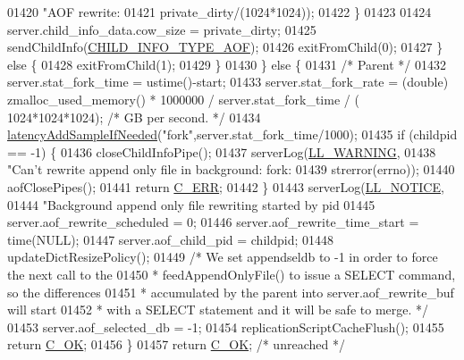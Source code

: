 \begin{DoxyCode}
{{{{{{{{{{{{{{{{{{{{{{{{01420                     \textcolor{stringliteral}{"AOF rewrite: %
01421                     private\_dirty/(1024*1024));
01422             \}
01423 
01424             server.child\_info\_data.cow\_size = private\_dirty;
01425             sendChildInfo(\hyperlink{server_8h_a9b759a9f6c6f785433572ab86a3ed214}{CHILD\_INFO\_TYPE\_AOF});
01426             exitFromChild(0);
01427         \} \textcolor{keywordflow}{else} \{
01428             exitFromChild(1);
01429         \}
01430     \} \textcolor{keywordflow}{else} \{
01431         \textcolor{comment}{/* Parent */}
01432         server.stat\_fork\_time = ustime()-start;
01433         server.stat\_fork\_rate = (\textcolor{keywordtype}{double}) zmalloc\_used\_memory() * 1000000 / server.stat\_fork\_time / (
      1024*1024*1024); \textcolor{comment}{/* GB per second. */}
01434         \hyperlink{latency_8h_a77922ab34035890c90f98831a9071359}{latencyAddSampleIfNeeded}(\textcolor{stringliteral}{"fork"},server.stat\_fork\_time/1000);
01435         \textcolor{keywordflow}{if} (childpid == -1) \{
01436             closeChildInfoPipe();
01437             serverLog(\hyperlink{server_8h_a31229b9334bba7d6be2a72970967a14b}{LL\_WARNING},
01438                 \textcolor{stringliteral}{"Can't rewrite append only file in background: fork: %
01439                 strerror(errno));
01440             aofClosePipes();
01441             \textcolor{keywordflow}{return} \hyperlink{server_8h_af98ac28d5f4d23d7ed5985188e6fb7d1}{C\_ERR};
01442         \}
01443         serverLog(\hyperlink{server_8h_a8c54c191e436c7dd3012167212692401}{LL\_NOTICE},
01444             \textcolor{stringliteral}{"Background append only file rewriting started by pid %
01445         server.aof\_rewrite\_scheduled = 0;
01446         server.aof\_rewrite\_time\_start = time(NULL);
01447         server.aof\_child\_pid = childpid;
01448         updateDictResizePolicy();
01449         \textcolor{comment}{/* We set appendseldb to -1 in order to force the next call to the}
01450 \textcolor{comment}{         * feedAppendOnlyFile() to issue a SELECT command, so the differences}
01451 \textcolor{comment}{         * accumulated by the parent into server.aof\_rewrite\_buf will start}
01452 \textcolor{comment}{         * with a SELECT statement and it will be safe to merge. */}
01453         server.aof\_selected\_db = -1;
01454         replicationScriptCacheFlush();
01455         \textcolor{keywordflow}{return} \hyperlink{server_8h_a303769ef1065076e68731584e758d3e1}{C\_OK};
01456     \}
01457     \textcolor{keywordflow}{return} \hyperlink{server_8h_a303769ef1065076e68731584e758d3e1}{C\_OK}; \textcolor{comment}{/* unreached */}
}}}}}}}}}}}}}}}}}}}}}}}}}}}
\end{DoxyCode}
